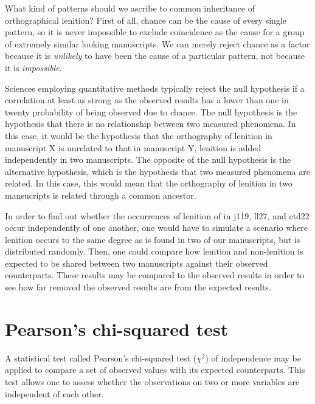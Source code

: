 What kind of patterns should we ascribe to common inheritance of orthographical lenition? First of all, chance can be the cause of every single pattern, so it is never impossible to exclude coincidence as the cause for a group of extremely similar looking manuscripts. We can merely reject chance as a factor because it is \emph{unlikely} to have been the cause of a particular pattern, not because it is \emph{impossible}.

Sciences employing quantitative methods typically reject the null hypothesis if a correlation at least as strong as the observed results has a lower than one in twenty probability of being observed due to chance.  The null hypothesis is the hypothesis that there is no relationship between two measured phenomena. In this case, it would be the hypothesis that the orthography of lenition in manuscript X is unrelated to that in manuscript Y, \ie lenition is added independently in two manuscripts. The opposite of the null hypothesis is the alternative hypothesis, which is the hypothesis that two measured phenomena are related. In this case, this would mean that the orthography of lenition in two mansucripts is related through a common ancestor.


In order to find out whether the occurrences of lenition of  in \gls{j119}, \gls{ll27}, and \gls{ctd22} occur independently of one another, one would have to simulate a scenario where lenition occurs to the same degree as is found in two of our manuscripts, but is distributed randomly. Then, one could compare how lenition and non-lenition is expected to be shared between two manuscripts against their observed counterparts. These results may  be compared to the observed results in order to see how far removed the observed results are from the expected results.

\section{Pearson's chi-squared test }
\label{sec:pearsons-chi-squared}


A statistical test called Pearson's chi-squared test (\(\chi^2\)) of independence may be applied to compare a set of observed values with its expected counterparts. This test allows one to assess whether the  observations on two or more variables are independent of each other.

